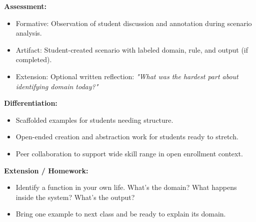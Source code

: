 \documentclass[12pt]{article}
\begin{document}
\textbf{Assessment:}
\begin{itemize}[nosep]
  \item Formative: Observation of student discussion and annotation during scenario analysis.
  \item Artifact: Student-created scenario with labeled domain, rule, and output (if completed).
  \item Extension: Optional written reflection: \textit{"What was the hardest part about identifying domain today?"}
\end{itemize}

\textbf{Differentiation:}
\begin{itemize}[nosep]
  \item Scaffolded examples for students needing structure.
  \item Open-ended creation and abstraction work for students ready to stretch.
  \item Peer collaboration to support wide skill range in open enrollment context.
\end{itemize}

\textbf{Extension / Homework:}
\begin{itemize}[nosep]
  \item Identify a function in your own life. What’s the domain? What happens inside the system? What’s the output?
  \item Bring one example to next class and be ready to explain its domain.
\end{itemize}
\end{document}
